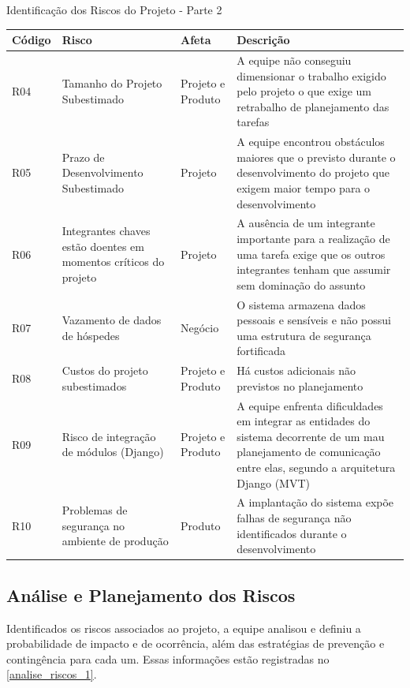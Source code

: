 \documentclass[
	12pt,				%
	openany,			%
	twoside,			%
	a4paper,			%
	english,			%
	french,				%
	spanish,			%
	brazil				%
	]{abntex2}
\begin{document}
			
\begin{quadro} [H]
	\caption{Identificação dos Riscos do Projeto - Parte 2} \label{identificacao_riscos_2} 
	\begin{tabular}{|p{2.8cm}|p{5cm}|p{3cm}|p{4.2cm}|}
		\hline
		\textbf{Código} & \textbf{Risco} & \textbf{Afeta} & \textbf{Descrição}  \\
		\hline			
			R04 & Tamanho do Projeto Subestimado &
			Projeto e Produto  & A equipe não conseguiu dimensionar o trabalho exigido pelo projeto o que exige um retrabalho de planejamento das tarefas \\
		\hline
			R05 & Prazo de Desenvolvimento Subestimado &
			Projeto & A equipe encontrou obstáculos maiores que o previsto durante o desenvolvimento do projeto que exigem maior tempo para o desenvolvimento \\
		\hline
			R06 & 	Integrantes chaves estão doentes em momentos críticos do projeto & Projeto & A ausência de um integrante importante para a realização de uma tarefa exige que os outros integrantes tenham que assumir sem dominação do assunto \\
		\hline
			R07 & Vazamento de dados de hóspedes & Negócio & O sistema  armazena dados pessoais e sensíveis e não possui uma estrutura de segurança fortificada \\
		\hline
			R08 & Custos do projeto subestimados & Projeto e Produto & Há custos adicionais não previstos no planejamento \\
		\hline
			R09 & Risco de integração de módulos (Django) & Projeto e Produto & A equipe enfrenta dificuldades em integrar as entidades do sistema decorrente de um mau planejamento de comunicação entre elas, segundo a arquitetura Django (MVT) \\
		\hline
			R10 & Problemas de segurança no ambiente de produção & Produto & A implantação do sistema expõe falhas de segurança não identificados durante o desenvolvimento \\
		\hline
\end{tabular}
\end{quadro}			
\subsection{Análise e Planejamento dos Riscos}
Identificados os riscos associados ao projeto, a equipe analisou e definiu a probabilidade de impacto e de ocorrência, além das estratégias de prevenção e contingência para cada um. Essas informações estão registradas no \autoref{analise_riscos_1}.
 
\end{document}
